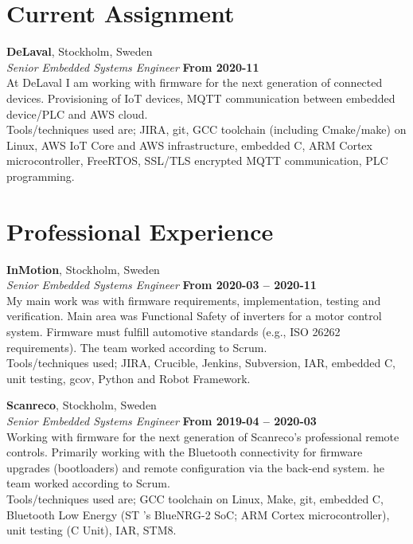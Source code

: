 \documentclass[a4paper,margin,line]{res} \usepackage{latexsym}
\begin{document}
\begin{resume}

\vspace{-.3cm}

\section{\sc Current Assignment}

{\bf DeLaval}, Stockholm, Sweden\\
{\em Senior Embedded Systems Engineer} \hfill {\bf From 2020-11 }\\
At DeLaval I am working with firmware for the next generation of
connected devices. Provisioning of IoT devices, MQTT communication
between embedded device/PLC and AWS cloud. \\ Tools/techniques used are;
JIRA, git, GCC toolchain (including Cmake/make) on Linux, AWS IoT Core
and AWS infrastructure, embedded C, ARM Cortex microcontroller,
FreeRTOS, SSL/TLS encrypted MQTT communication, PLC programming.

\section{\sc Professional Experience}

{\bf InMotion}, Stockholm, Sweden\\
{\em Senior Embedded Systems Engineer} \hfill {\bf From 2020-03 --
  2020-11}\\ My main work was with firmware requirements,
implementation, testing and verification. Main area was Functional
Safety of inverters for a motor control system. Firmware must fulfill
automotive standards (e.g., ISO 26262 requirements). The team worked
according to Scrum. \\ Tools/techniques used; JIRA, Crucible, Jenkins,
Subversion, IAR, embedded C, unit testing, gcov, Python and Robot
Framework.

{\bf Scanreco}, Stockholm, Sweden\\
{\em Senior Embedded Systems Engineer} \hfill {\bf From 2019-04 --
  2020-03}\\ Working with firmware for the next generation of
Scanreco's professional remote controls. Primarily working with the
Bluetooth connectivity for firmware upgrades (bootloaders) and remote
configuration via the back-end system. he team worked according to
Scrum. \\ Tools/techniques used are; GCC toolchain on Linux, Make, git,
embedded C, Bluetooth Low Energy (ST 's BlueNRG-2 SoC; ARM Cortex
microcontroller), unit testing (C Unit), IAR, STM8.


\end{resume}
\end{document}
